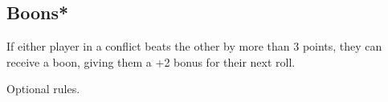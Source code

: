 \documentclass[nodeprecatedcode,bg=print]{dndbook}
\begin{document}
\begin{paracol}{2}
    \DamageBox[]

    \section*{Boons*}
    If either player in a conflict beats the other by more than 3 points, they can receive a boon, giving them a +2 bonus for their next roll.

\end{paracol}

\vspace*{\fill}

{\small * Optional rules.}
\end{document}

